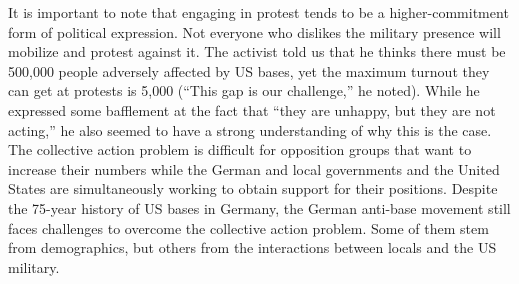 			
			It is important to note that engaging in protest tends to be a higher-commitment form of political expression. Not everyone who dislikes the military presence will mobilize and protest against it.  The activist told us that he thinks there must be 500,000 people adversely affected by US bases, yet the maximum turnout they can get at protests is 5,000 (``This gap is our challenge,'' he noted).\cite{berlinone20190723} While he expressed some bafflement at the fact that ``they are unhappy, but they are not acting,'' he also seemed to have a strong understanding of why this is the case. The collective action problem is difficult for opposition groups that want to increase their numbers while the German and local governments and the United States are simultaneously working to obtain support for their positions. Despite the 75-year history of US bases in Germany, the German anti-base movement still faces challenges to overcome the collective action problem. Some of them stem from demographics, but others from the interactions between locals and the US military.
			
			
			
			
			
